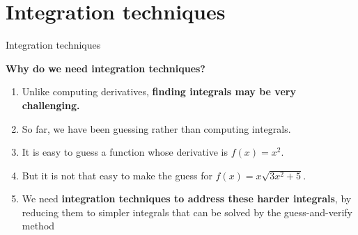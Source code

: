 \documentclass[9pt]{beamer}
\begin{document}
\section{Integration techniques}
\begin{frame}{Integration techniques}

    \textbf{Why do we need integration techniques?}
    \begin{enumerate}[leftmargin = 0.5cm, label = $\bullet$, rightmargin = 0.2cm]

    \item Unlike computing derivatives, \textbf{finding integrals may be very challenging.}
    \vspace{0.2cm}

    \item So far, we have been guessing rather than computing integrals.
    \vspace{0.2cm}

    \item It is easy to guess a function whose derivative is $f(x) = x^2$.
    \vspace{0.2cm}

    \item But it is not that easy to make the guess for $f(x) = x\sqrt{3x^2 + 5}$.
    \vspace{0.2cm}

    \item We need \textbf{integration techniques to address these harder integrals}, by reducing them to simpler integrals that can be solved by the guess-and-verify method

    \end{enumerate}
    
\end{frame}
\end{document}
